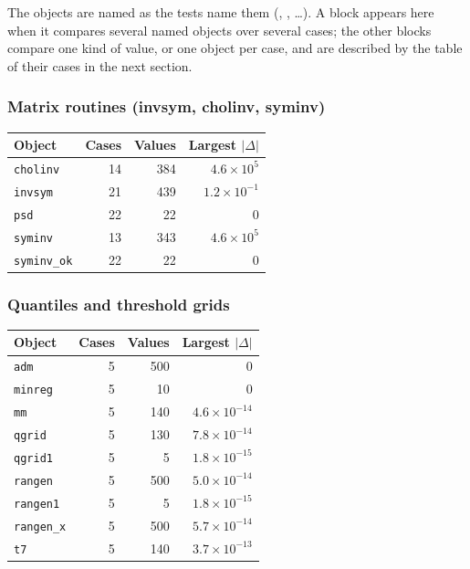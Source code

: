 The objects are named as the tests name them (, , \ldots). A block appears here when it compares several named objects over several cases; the other blocks compare one kind of value, or one object per case, and are described by the table of their cases in the next section.

\subsubsection*{Matrix routines (invsym, cholinv, syminv)}

\begin{longtable}{@{}p{8.2cm}rrr@{}}
\toprule
Object & Cases & Values & Largest $|\Delta|$ \\
\midrule
\endhead
\texttt{cholinv} & 14 & 384 & $4.6\times10^{5}$ \\
\texttt{invsym} & 21 & 439 & $1.2\times10^{-1}$ \\
\texttt{psd} & 22 & 22 & 0 \\
\texttt{syminv} & 13 & 343 & $4.6\times10^{5}$ \\
\texttt{syminv\_\allowbreak{}ok} & 22 & 22 & 0 \\
\bottomrule
\end{longtable}

\subsubsection*{Quantiles and threshold grids}

\begin{longtable}{@{}p{8.2cm}rrr@{}}
\toprule
Object & Cases & Values & Largest $|\Delta|$ \\
\midrule
\endhead
\texttt{adm} & 5 & 500 & 0 \\
\texttt{minreg} & 5 & 10 & 0 \\
\texttt{mm} & 5 & 140 & $4.6\times10^{-14}$ \\
\texttt{qgrid} & 5 & 130 & $7.8\times10^{-14}$ \\
\texttt{qgrid1} & 5 & 5 & $1.8\times10^{-15}$ \\
\texttt{rangen} & 5 & 500 & $5.0\times10^{-14}$ \\
\texttt{rangen1} & 5 & 5 & $1.8\times10^{-15}$ \\
\texttt{rangen\_\allowbreak{}x} & 5 & 500 & $5.7\times10^{-14}$ \\
\texttt{t7} & 5 & 140 & $3.7\times10^{-13}$ \\
\bottomrule
\end{longtable}

